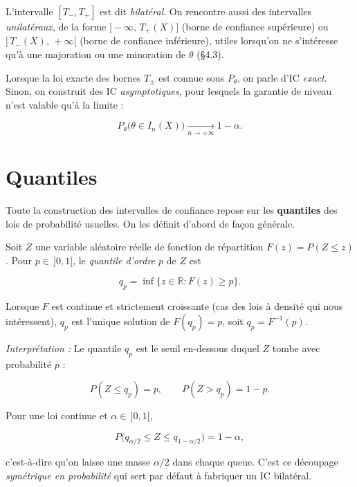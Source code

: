 \begin{remarque}
L'intervalle $[T_-, T_+]$ est dit \textit{bilatéral}. On rencontre aussi des intervalles \textit{unilatéraux}, de la forme $]-\infty,\, T_+(X)]$ (borne de confiance supérieure) ou $[\,T_-(X),\, +\infty[$ (borne de confiance inférieure), utiles lorsqu'on ne s'intéresse qu'à une majoration ou une minoration de $\theta$ (§4.3).
\end{remarque}

\begin{remarque} 
Lorsque la loi exacte des bornes $T_\pm$ est connue sous $P_\theta$, on parle d'IC \textit{exact}. Sinon, on construit des IC \textit{asymptotiques}, pour lesquels la garantie de niveau n'est valable qu'à la limite :

$$
P_\theta\big(\theta \in I_n(X)\big) \xrightarrow[n\to+\infty]{} 1-\alpha.
$$
\end{remarque}

\section{Quantiles}

Toute la construction des intervalles de confiance repose sur les \textbf{quantiles} des lois de probabilité usuelles. On les définit d'abord de façon générale.

\medskip

\begin{mdframed}
\begin{definition} 
Soit $Z$ une variable aléatoire réelle de fonction de répartition $F(z) = P(Z \le z)$. Pour $p \in\, ]0,1[$, le \textit{quantile d'ordre $p$} de $Z$ est

$$
q_p = \inf\{z \in \mathbb R : F(z) \ge p\}.
$$

Lorsque $F$ est continue et strictement croissante (cas des lois à densité qui nous intéressent), $q_p$ est l'unique solution de $F(q_p) = p$, soit $q_p = F^{-1}(p)$.
\end{definition}
\end{mdframed}

\textit{Interprétation : } Le quantile $q_p$ est le seuil en-dessous duquel $Z$ tombe avec probabilité $p$ :

$$
P(Z \le q_p) = p, \qquad P(Z > q_p) = 1-p.
$$

\medskip

\begin{mdframed}
\begin{proposition} 
Pour une loi continue et $\alpha \in\, ]0,1[$,

$$
P\big(q_{\alpha/2} \le Z \le q_{1-\alpha/2}\big) = 1-\alpha,
$$

c'est-à-dire qu'on laisse une masse $\alpha/2$ dans chaque queue. C'est ce découpage \textit{symétrique en probabilité} qui sert par défaut à fabriquer un IC bilatéral.
\end{proposition}
\end{mdframed}

